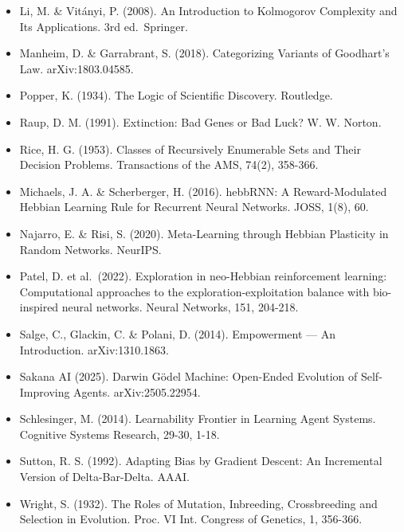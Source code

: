 \documentclass[
  11pt,
]{article}
\begin{document}
\begin{itemize}
  Lakatos, I. (1978). The Methodology of Scientific Research Programmes.
  Cambridge University Press.
\item
  Li, M. \& Vitányi, P. (2008). An Introduction to Kolmogorov Complexity
  and Its Applications. 3rd ed.~Springer.
\item
  Manheim, D. \& Garrabrant, S. (2018). Categorizing Variants of
  Goodhart's Law. arXiv:1803.04585.
\item
  Popper, K. (1934). The Logic of Scientific Discovery. Routledge.
\item
  Raup, D. M. (1991). Extinction: Bad Genes or Bad Luck? W. W. Norton.
\item
  Rice, H. G. (1953). Classes of Recursively Enumerable Sets and Their
  Decision Problems. Transactions of the AMS, 74(2), 358-366.
\item
  Michaels, J. A. \& Scherberger, H. (2016). hebbRNN: A Reward-Modulated
  Hebbian Learning Rule for Recurrent Neural Networks. JOSS, 1(8), 60.
\item
  Najarro, E. \& Risi, S. (2020). Meta-Learning through Hebbian
  Plasticity in Random Networks. NeurIPS.
\item
  Patel, D. et al.~(2022). Exploration in neo-Hebbian reinforcement
  learning: Computational approaches to the exploration-exploitation
  balance with bio-inspired neural networks. Neural Networks, 151,
  204-218.
\item
  Salge, C., Glackin, C. \& Polani, D. (2014). Empowerment --- An
  Introduction. arXiv:1310.1863.
\item
  Sakana AI (2025). Darwin Gödel Machine: Open-Ended Evolution of
  Self-Improving Agents. arXiv:2505.22954.
\item
  Schlesinger, M. (2014). Learnability Frontier in Learning Agent
  Systems. Cognitive Systems Research, 29-30, 1-18.
\item
  Sutton, R. S. (1992). Adapting Bias by Gradient Descent: An
  Incremental Version of Delta-Bar-Delta. AAAI.
\item
  Wright, S. (1932). The Roles of Mutation, Inbreeding, Crossbreeding
  and Selection in Evolution. Proc. VI Int. Congress of Genetics, 1,
  356-366.
\end{itemize}
\end{document}

